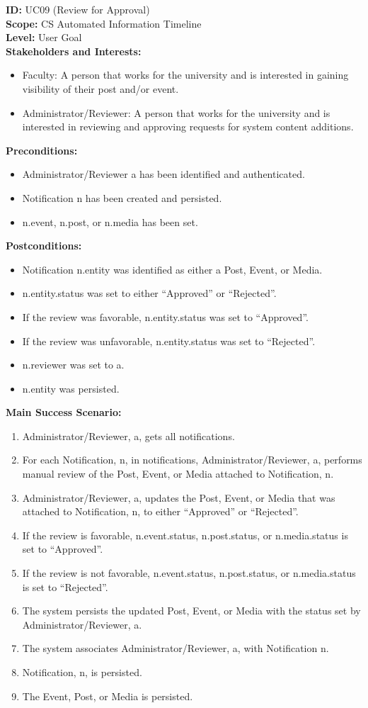 \textbf{ID:} UC09 (Review for Approval) \\
\textbf{Scope:} CS Automated Information Timeline \\
\textbf{Level:} User Goal \\
\textbf{Stakeholders and Interests:}
\begin{itemize}
    \item Faculty: A person that works for the university and is interested in gaining visibility of their post and/or event.
    \item Administrator/Reviewer: A person that works for the university and is interested in reviewing and approving requests for system content additions.
\end{itemize}
\textbf{Preconditions:}
\begin{itemize}
    \item Administrator/Reviewer a has been identified and authenticated.
    \item Notification n has been created and persisted.
    \item n.event, n.post, or n.media has been set.
\end{itemize}
\textbf{Postconditions:}
\begin{itemize}
    \item Notification n.entity was identified as either a Post, Event, or Media.
    \item n.entity.status was set to either “Approved” or “Rejected”.
    \item If the review was favorable, n.entity.status was set to “Approved”.
    \item If the review was unfavorable, n.entity.status was set to “Rejected”.
    \item n.reviewer was set to a.
    \item n.entity was persisted.
\end{itemize}
\textbf{Main Success Scenario:}
\begin{enumerate}
    \item Administrator/Reviewer, a, gets all notifications.
    \item For each Notification, n, in notifications, Administrator/Reviewer, a, performs manual review of the Post, Event, or Media attached to Notification, n.
    \item Administrator/Reviewer, a, updates the Post, Event, or Media that was attached to Notification, n, to either “Approved” or “Rejected”.
    \item If the review is favorable, n.event.status, n.post.status, or n.media.status is set to “Approved”.
    \item If the review is not favorable, n.event.status, n.post.status, or n.media.status is set to “Rejected”.
    \item The system persists the updated Post, Event, or Media with the status set by Administrator/Reviewer, a.
    \item The system associates Administrator/Reviewer, a, with Notification n.
    \item Notification, n, is persisted.
    \item The Event, Post, or Media is persisted.
\end{enumerate}
